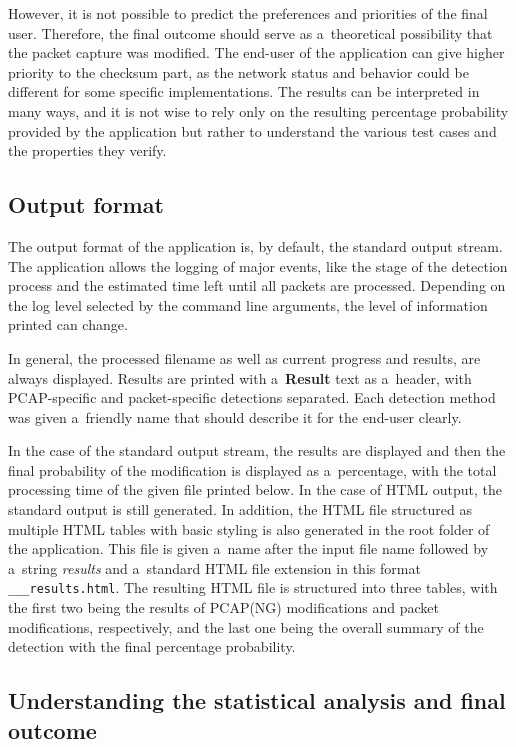 \documentclass[
  printed,     %
  color,       %
  oneside,     %
  nosansbold,  %
  nocolorbold, %
  nolof,         %
  nolot,         %
]{fithesis4}
\begin{document}
However, it is not possible to predict the preferences and priorities of the final user. Therefore, the final outcome should serve as a~theoretical possibility that the packet capture was modified. The end-user of the application can give higher priority to the checksum part, as the network status and behavior could be different for some specific implementations. The results can be interpreted in many ways, and it is not wise to rely only on the resulting percentage probability provided by the application but rather to understand the various test cases and the properties they verify.

\subsection{Output format}

The output format of the application is, by default, the standard output stream. The application allows the logging of major events, like the stage of the detection process and the estimated time left until all packets are processed. Depending on the log level selected by the command line arguments, the level of information printed can change. 

In general, the processed filename as well as current progress and results, are always displayed. Results are printed with a~\textbf{Result} text as a~header, with PCAP-specific and packet-specific detections separated. Each detection method was given a~friendly name that should describe it for the end-user clearly.

In the case of the standard output stream, the results are displayed and then the final probability of the modification is displayed as a~percentage, with the total processing time of the given file printed below. In the case of HTML output, the standard output is still generated. In addition, the HTML file structured as multiple HTML tables with basic styling is also generated in the root folder of the application. This file is given a~name after the input file name followed by a~string \textit{results} and a~standard HTML file extension in this format \texttt{\_\_\_results.html}. The resulting HTML file is structured into three tables, with the first two being the results of PCAP(NG) modifications and packet modifications, respectively, and the last one being the overall summary of the detection with the final percentage probability.

\subsection{Understanding the statistical analysis and final outcome}
\end{document}
